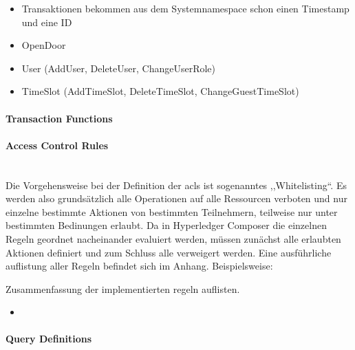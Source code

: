             \begin{itemize}[noitemsep]
                \item Transaktionen bekommen aus dem Systemnamespace schon einen Timestamp und eine ID
                \item OpenDoor
                \item User (AddUser, DeleteUser, ChangeUserRole)
                \item TimeSlot (AddTimeSlot, DeleteTimeSlot, ChangeGuestTimeSlot)
            \end{itemize}
    
    \paragraph{\textrm{Transaction Functions}}
    
    \paragraph{\textrm{Access Control Rules}}\hspace{0cm}\\
        Die Vorgehensweise bei der Definition der \gls{acl}s ist sogenanntes ,,Whitelisting``. 
        Es werden also grundsätzlich alle Operationen auf alle Ressourcen verboten und nur einzelne bestimmte Aktionen von bestimmten Teilnehmern, teilweise nur unter bestimmten Bedinungen erlaubt. 
        Da in Hyperledger Composer die einzelnen Regeln geordnet nacheinander evaluiert werden, müssen zunächst alle erlaubten Aktionen definiert und zum Schluss alle verweigert werden. 
        Eine ausführliche auflistung aller Regeln befindet sich im Anhang. 
        Beispielsweise:
        
        Zusammenfassung der implementierten regeln auflisten.
        \begin{itemize}[noitemsep]
            \item 
        \end{itemize}
        
    \paragraph{Query Definitions}
    


